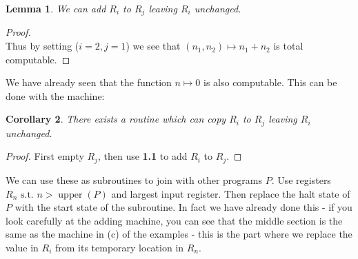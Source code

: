 \documentclass[10pt,a4paper]{article}
\newcommand{\st}{\text{ s.t. }}
\DeclareMathOperator{\upper}{upper}
\newtheorem{t1}{Lemma}[section]
\newtheorem{t2}[t1]{Corollary}
\begin{document}
\begin{t1}
We can add $R_i$ to $R_j$ leaving $R_i$ unchanged.
\end{t1}
\begin{proof}
\item
\centering
{}\\
Thus by setting ($i=2, j=1$) we see that $(n_1, n_2) \mapsto n_1 + n_2$ is total computable.
\end{proof}
We have already seen that the function $n\mapsto 0$ is also computable. This can be done with the machine:
\begin{center}
\end{center}
\begin{t2}
There exists a routine which can copy $R_i$ to $R_j$ leaving $R_i$ unchanged.
\end{t2}
\begin{proof}
First empty $R_j$, then use \textbf{1.1} to add $R_i$ to $R_j$.
\end{proof}
We can use these as subroutines to join with other programs $P$. Use registers $R_n \st n> \upper(P)$ and largest input register. Then replace the halt state of $P$ with the start state of the subroutine. In fact we have already done this - if you look carefully at the adding machine, you can see that the middle section is the same as the machine in (c) of the examples - this is the part where we replace the value in $R_i$ from its temporary location in $R_n$.
\end{document}
